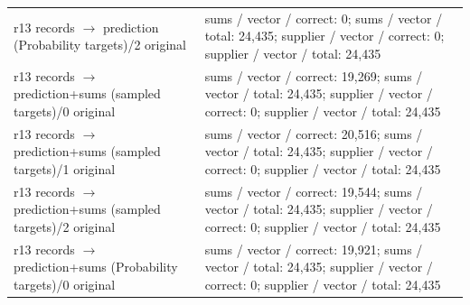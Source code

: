 \begin{longtable}{@{}>{\raggedright\arraybackslash}p{1.800in}>{\raggedright\arraybackslash}p{4.200in}@{}}
r13 records $\to$ prediction (Probability targets)/\allowbreak{}2 original & sums /\allowbreak{} vector /\allowbreak{} correct: 0; sums /\allowbreak{} vector /\allowbreak{} total: 24,435; supplier /\allowbreak{} vector /\allowbreak{} correct: 0; supplier /\allowbreak{} vector /\allowbreak{} total: 24,435 \\
r13 records $\to$ prediction+sums (sampled targets)/\allowbreak{}0 original & sums /\allowbreak{} vector /\allowbreak{} correct: 19,269; sums /\allowbreak{} vector /\allowbreak{} total: 24,435; supplier /\allowbreak{} vector /\allowbreak{} correct: 0; supplier /\allowbreak{} vector /\allowbreak{} total: 24,435 \\
r13 records $\to$ prediction+sums (sampled targets)/\allowbreak{}1 original & sums /\allowbreak{} vector /\allowbreak{} correct: 20,516; sums /\allowbreak{} vector /\allowbreak{} total: 24,435; supplier /\allowbreak{} vector /\allowbreak{} correct: 0; supplier /\allowbreak{} vector /\allowbreak{} total: 24,435 \\*
r13 records $\to$ prediction+sums (sampled targets)/\allowbreak{}2 original & sums /\allowbreak{} vector /\allowbreak{} correct: 19,544; sums /\allowbreak{} vector /\allowbreak{} total: 24,435; supplier /\allowbreak{} vector /\allowbreak{} correct: 0; supplier /\allowbreak{} vector /\allowbreak{} total: 24,435 \\*
r13 records $\to$ prediction+sums (Probability targets)/\allowbreak{}0 original & sums /\allowbreak{} vector /\allowbreak{} correct: 19,921; sums /\allowbreak{} vector /\allowbreak{} total: 24,435; supplier /\allowbreak{} vector /\allowbreak{} correct: 0; supplier /\allowbreak{} vector /\allowbreak{} total: 24,435 \\
\end{longtable}
\endgroup
